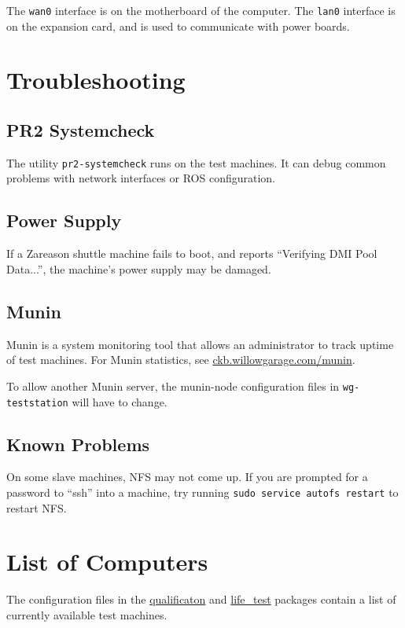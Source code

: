 \documentclass[11pt]{book}
\begin{document}
The \texttt{wan0} interface is on the motherboard of the computer. The \texttt{lan0} interface is on the expansion card, and is used to communicate with power boards.

\section{Troubleshooting}

\subsection{PR2 Systemcheck}

The utility \texttt{pr2-systemcheck} runs on the test machines. It can debug common problems with network interfaces or ROS configuration.

\subsection{Power Supply}

If a Zareason shuttle machine fails to boot, and reports ``Verifying DMI Pool Data...'', the machine's power supply may be damaged. 

\subsection{Munin}

Munin is a system monitoring tool that allows an administrator to track uptime of test machines. For Munin statistics, see \href{http://ckb.willowgarage.com/munin}{ckb.willowgarage.com/munin}.

To allow another Munin server, the munin-node configuration files in \texttt{wg-teststation} will have to change.

\subsection{Known Problems}

On some slave machines, NFS may not come up. If you are prompted for a password to ``ssh'' into a machine, try running \texttt{sudo service autofs restart} to restart NFS.

\section{List of Computers}

The configuration files in the \href{http://www.ros.org/wiki/qualification}{qualificaton} and \href{http://www.ros.org/wiki/life\_test}{life\_test} packages contain a list of currently available test machines. 
\end{document}
